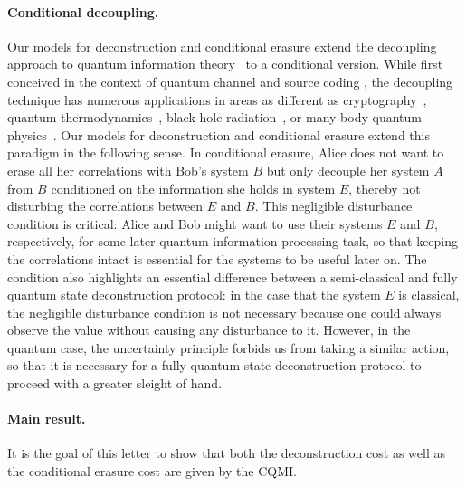 \documentclass[a4paper,aps,prl,twocolumn,10pt,superscriptaddress]{revtex4-1}
\theoremstyle{plain}
\theoremstyle{definition}
\begin{document}
\paragraph{Conditional decoupling.}
Our models for deconstruction and conditional erasure extend the decoupling approach to quantum information theory~\cite{qip2002schu,horodecki05,qcap2008first,dupuis10,dupuis09} to a conditional version. While first conceived in the context of quantum channel \cite{qip2002schu} and source coding \cite{horodecki05}, the decoupling technique has numerous applications in areas as different as cryptography~\cite{Berta14}, quantum thermodynamics~\cite{RARDV10,Aberg13}, black hole radiation~\cite{HayPre07,braunstein-pati,braunstein-zyczkowski}, or many body quantum physics~\cite{Brandao12}.
Our models for deconstruction and conditional erasure extend this paradigm in the following sense. In conditional erasure, Alice does not want to erase all her correlations with Bob's system $B$ but only decouple her system $A$ from $B$ conditioned on the information she holds in system $E$, thereby not disturbing the correlations between $E$ and $B$. This negligible disturbance condition is critical: Alice and Bob might want to use their systems $E$ and $B$, respectively, for some later quantum information processing task, so that keeping the correlations intact is essential for the systems to be useful later on. The condition also highlights an essential difference between a semi-classical and fully quantum state deconstruction protocol: in the case that the system $E$ is classical, the negligible disturbance condition is not necessary because one could always observe the value without causing any disturbance to it. However, in the quantum case, the uncertainty principle forbids us from taking a similar action, so that it is necessary for a fully quantum state deconstruction protocol to proceed with a greater sleight of hand.


\paragraph{Main result.} It is the goal of this letter to show that both the deconstruction cost as well as the conditional erasure cost are given by the CQMI.
\end{document}
